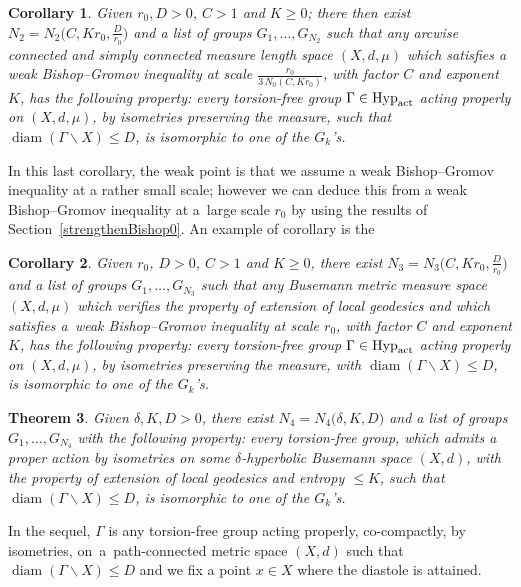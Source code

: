 \documentclass[10pt,a4paper]{amsart}
\numberwithin{equation}{section}
\newtheorem{theor}{Theorem}[section]
\newtheorem{Corollary}[theor]{Corollary}
\newcommand{\diam}{\operatorname{diam}}
\begin{document}
\begin{Corollary}\label{majorgroupes2}
Given $r_0, D >0$, $C > 1 $ and $K\ge 0$; there then exist $N_2 = N_2 \big(C, K r_0, \frac{D}{r_0}\big)$ and a list of groups $G_1,\dots, G_{N_2} $
such that any arcwise connected and simply connected measure length space
$(X,d,\mu)$ which satisfies a weak Bishop--Gromov inequality at scale
$\frac{r_0}{3\, N_0 (C, Kr_0)}$, with factor $C$ and exponent $K$, has the following property: every torsion-free group $\Gamma \in {\rm Hyp}_{\rm act}$ acting properly on $(X,d,\mu)$, by isometries preserving the measure, such that $\diam (\Gamma \backslash X) \le D$, is isomorphic to one of the $G_k$'s.
\end{Corollary}

In this last corollary, the weak point is that we assume a weak Bishop--Gromov inequality at a rather small scale; however we can deduce this
from a weak Bishop--Gromov inequality at a~large scale $r_0$ by using the results of Section~\ref{strengthenBishop0}. An example of corollary is the

\begin{Corollary}\label{majorgroupes3}
Given $r_0$, $D >0$, $C > 1 $ and $K\ge 0$, there exist $N_3 = N_3 \big(C, K r_0, \frac{D}{r_0}\big)$ and a list of groups $G_1,\dots, G_{N_3}$
such that any Busemann metric measure space $(X,d,\mu)$ which verifies the property of extension of local
geodesics and which satisfies a~weak Bishop--Gromov inequality at scale $r_0$, with factor $C$ and exponent $K$, has the following property: every torsion-free group
$\Gamma \in \text{\rm Hyp}_{\rm act}$ acting properly on $(X,d,\mu)$, by isometries preserving the measure, with $\diam (\Gamma \backslash X) \le D$, is isomorphic to one of the $G_k$'s.
\end{Corollary}

\begin{theor}\label{majorgroupes5}
Given $\delta, K, D\! >0$, there exist $N_4\! =\! N_4 \big(\delta, K, D \big)$ and a list of groups $G_1,\dots, G_{N_4}$ with the following property:
every torsion-free group, which admits a proper action by isomet\-ries on some $\delta$-hyperbolic Busemann space $(X,d)$, with
the property of extension of local geodesics and entropy $\le K$, such that $\diam (\Gamma \backslash X) \le D$, is isomorphic to one of the $G_k$'s.
\end{theor}



In the sequel, $\Gamma$ is any torsion-free group acting properly, co-compactly, by isometries, on~a~path-connected metric space $(X,d)$ such that
$\diam (\Gamma \backslash X) \le D$ and we fix a point $x \in X$ where the diastole is attained.
\end{document}
